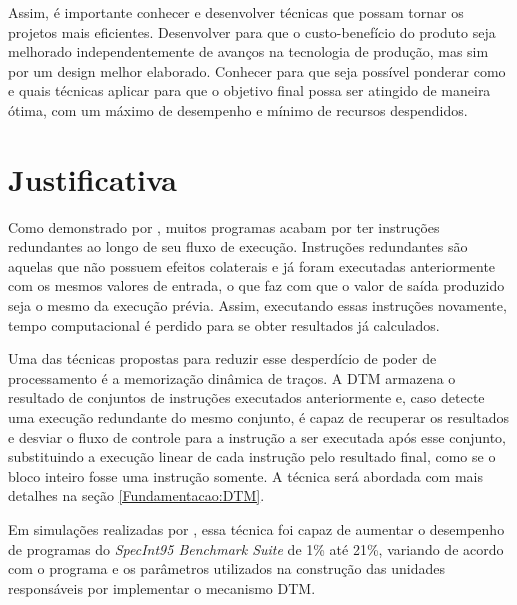 Assim, é importante conhecer e desenvolver técnicas que possam tornar os projetos mais eficientes. Desenvolver para que o custo-benefício do produto seja melhorado independentemente de avanços na tecnologia de produção, mas sim por um design melhor elaborado. Conhecer para que seja possível ponderar como e quais técnicas aplicar para que o objetivo final possa ser atingido de maneira ótima, com um máximo de desempenho e mínimo de recursos despendidos.



\section{Justificativa}
\label{Introducao:Justificativa} %


Como demonstrado por , muitos programas acabam por ter instruções redundantes ao longo de seu fluxo de execução. Instruções redundantes são aquelas que não possuem efeitos colaterais e já foram executadas anteriormente com os mesmos valores de entrada, o que faz com que o valor de saída produzido seja o mesmo da execução prévia. Assim, executando essas instruções novamente, tempo computacional é perdido para se obter resultados já calculados.

Uma das técnicas propostas para reduzir esse desperdício de poder de processamento é a memorização dinâmica de traços. A DTM armazena o resultado de conjuntos de instruções executados anteriormente e, caso detecte uma execução redundante do mesmo conjunto, é capaz de recuperar os resultados e desviar o fluxo de controle para a instrução a ser executada após esse conjunto, substituindo a execução linear de cada instrução pelo resultado final, como se o bloco inteiro fosse uma instrução somente. A técnica será abordada com mais detalhes na seção \ref{Fundamentacao:DTM}.

Em simulações realizadas por , essa técnica foi capaz de aumentar o desempenho de programas do \textit{SpecInt95 Benchmark Suite} de 1\% até 21\%, variando de acordo com o programa e os parâmetros utilizados na construção das unidades responsáveis por implementar o mecanismo DTM.

